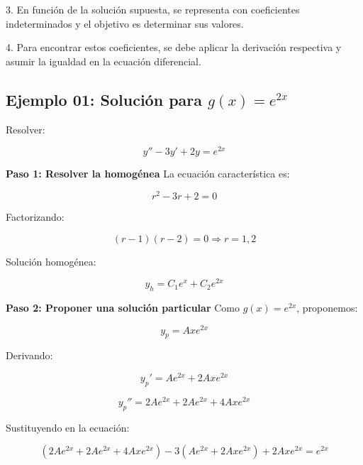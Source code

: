 3. En función de la solución supuesta, se representa con coeficientes indeterminados y el objetivo es determinar sus valores.

4. Para encontrar estos coeficientes, se debe aplicar la derivación respectiva y asumir la igualdad en la ecuación diferencial.



\subsection*{Ejemplo 01: Solución para \( g(x) = e^{2x} \)}
Resolver:

\begin{equation}
y'' - 3y' + 2y = e^{2x}
\end{equation}

\textbf{Paso 1: Resolver la homogénea}
La ecuación característica es:

\begin{equation}
r^2 - 3r + 2 = 0
\end{equation}

Factorizando:

\begin{equation}
(r - 1)(r - 2) = 0 \Rightarrow r = 1, 2
\end{equation}

Solución homogénea:

\begin{equation}
y_h = C_1 e^x + C_2 e^{2x}
\end{equation}

\textbf{Paso 2: Proponer una solución particular}
Como \( g(x) = e^{2x} \), proponemos:

\begin{equation}
y_p = A x e^{2x}
\end{equation}

Derivando:

\begin{equation}
y_p' = A e^{2x} + 2Ax e^{2x}
\end{equation}

\begin{equation}
y_p'' = 2A e^{2x} + 2A e^{2x} + 4Ax e^{2x}
\end{equation}

Sustituyendo en la ecuación:

\begin{equation}
(2A e^{2x} + 2A e^{2x} + 4Ax e^{2x}) - 3(A e^{2x} + 2Ax e^{2x}) + 2Ax e^{2x} = e^{2x}
\end{equation}

